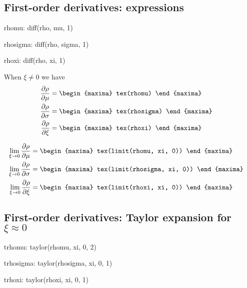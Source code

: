 \subsection{First-order derivatives: expressions}
\begin{maxima}
   rhomu: diff(rho, mu, 1)
\end{maxima}
\begin{maxima}
  rhosigma: diff(rho, sigma, 1)
\end{maxima}
\begin{maxima}
  rhoxi: diff(rho, xi, 1)
\end{maxima}

When $\xi \neq 0$ we have
{\color{MonVertF}
\begin{align*}
\frac{\partial \rho}{\partial \mu} &=
\begin{maxima}
 tex(rhomu)
\end{maxima}
\\
\frac{\partial \rho}{\partial \sigma}  &=
\begin{maxima}
 tex(rhosigma)
\end{maxima}
\\
\frac{\partial \rho}{\partial \xi} &=
\begin{maxima}
 tex(rhoxi)
\end{maxima}
\end{align*}
}

{\color{MonVertF}
\begin{align*}
\lim_{\xi \to 0} \frac{\partial \rho}{\partial \mu} &= 
\begin{maxima}
 tex(limit(rhomu, xi, 0))
\end{maxima}
\\
\lim_{\xi \to 0} \frac{\partial \rho}{\partial \sigma} &= 
\begin{maxima}
 tex(limit(rhosigma, xi, 0))
\end{maxima}
\\
\lim_{\xi \to 0} \frac{\partial \rho}{\partial \xi} &= 
\begin{maxima}
 tex(limit(rhoxi, xi, 0))
\end{maxima}
\end{align*}
}

\subsection{First-order derivatives: Taylor expansion for $\xi \approx 0$}
{\color{MonVertF}
\begin{maxima}
  trhomu: taylor(rhomu, xi, 0, 2)
\end{maxima}
\begin{maxima}
  trhosigma: taylor(rhosigma, xi, 0, 1)
\end{maxima}
\begin{maxima}
  trhoxi: taylor(rhoxi, xi, 0, 1)
\end{maxima}
}

